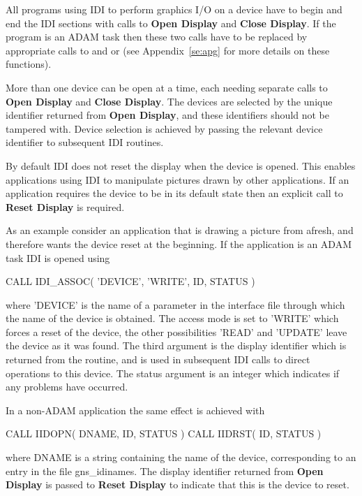 \documentclass[11pt,nolof]{starlink}
\begin{document}
All programs using IDI to perform graphics I/O on a device have to begin and
end the IDI sections with calls to \textbf{Open Display} and \textbf{Close Display}.
If the program is an ADAM task then these two calls have to be replaced by
appropriate calls to  and
 or 
(see Appendix~\ref{se:apg} for more details on these functions).

More than one device can be open at a time, each needing separate calls
to \textbf{Open Display} and \textbf{Close Display}. The devices are selected
by the unique identifier returned from \textbf{Open Display}, and these
identifiers should not be tampered with. Device selection is achieved by
passing the relevant device identifier to subsequent IDI routines.

By default IDI does not reset the display when the device is opened.
This enables applications using IDI to manipulate pictures drawn by
other applications. If an application requires the device to be in its
default state then an explicit call to \textbf{Reset Display} is required.

As an example consider an application that is drawing a picture from
afresh, and therefore wants the device reset at the beginning. If the
application is an ADAM task IDI is opened using
\begin{small}
\begin{terminalv}
      CALL IDI_ASSOC( 'DEVICE', 'WRITE', ID, STATUS )
\end{terminalv}
\end{small}
where 'DEVICE' is the name of a parameter in the interface file
through which the name of the device is obtained. The access mode
is set to 'WRITE' which forces a reset of the device, the other
possibilities 'READ' and 'UPDATE' leave the device as it was found.
The third argument is the display identifier which is returned from
the routine, and is used in subsequent IDI calls to direct operations
to this device. The status argument is an integer which indicates if
any problems have occurred.

In a non-ADAM application the same effect is achieved with
\begin{small}
\begin{terminalv}
      CALL IIDOPN( DNAME, ID, STATUS )
      CALL IIDRST( ID, STATUS )
\end{terminalv}
\end{small}
where DNAME is a string containing the name of the device, corresponding
to an entry in the file gns\_idinames. The display identifier returned
from \textbf{Open Display} is passed to \textbf{Reset Display} to indicate
that this is the device to reset.
\end{document}
